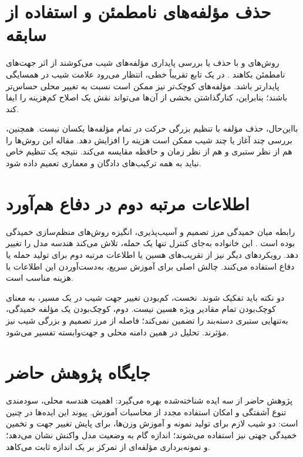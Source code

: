\section{حذف مؤلفه‌های نامطمئن و استفاده از سابقه}
روش‌های  و  با حذف یا بررسی پایداری مؤلفه‌های شیب می‌کوشند از اثر جهت‌های نامطمئن بکاهند \cite{golgooni2023zerograd}. در یک تابع تقریباً خطی، انتظار می‌رود علامت شیب در همسایگی پایدارتر باشد. مؤلفه‌های کوچک‌تر نیز ممکن است نسبت به تغییر محلی حساس‌تر باشند؛ بنابراین، کنارگذاشتن بخشی از آن‌ها می‌تواند نقش یک اصلاح کم‌هزینه را ایفا کند.

بااین‌حال، حذف مؤلفه با تنظیم بزرگی حرکت در تمام مؤلفه‌ها یکسان نیست. همچنین، بررسی چند آغاز یا چند شیب ممکن است هزینه را افزایش دهد. مقاله \sora{} این روش‌ها را هم از نظر ستبری و هم از نظر زمان و حافظه مقایسه می‌کند. نتیجه یک تنظیم خاص نباید به همه ترکیب‌های دادگان و معماری تعمیم داده شود.

\section{اطلاعات مرتبه دوم در دفاع هم‌آورد}
رابطه میان خمیدگی مرز تصمیم و آسیب‌پذیری، انگیزه روش‌های منظم‌سازی خمیدگی بوده است \cite{moosavi2019robustness}. این خانواده به‌جای کنترل تنها یک حمله، تلاش می‌کند هندسه مدل را تغییر دهد. رویکردهای دیگر نیز از تقریب‌های هسین یا اطلاعات مرتبه دوم برای تولید حمله یا دفاع استفاده می‌کنند. چالش اصلی برای آموزش سریع، به‌دست‌آوردن این اطلاعات با هزینه مناسب است.

دو نکته باید تفکیک شوند. نخست، کم‌بودن تغییر جهت شیب در یک مسیر، به معنای کوچک‌بودن تمام مقادیر ویژه هسین نیست. دوم، کوچک‌بودن یک مؤلفه خمیدگی، به‌تنهایی ستبری دسته‌بند را تضمین نمی‌کند؛ فاصله از مرز تصمیم و بزرگی شیب نیز مؤثرند. تحلیل \pertalign{} در همین دامنه محلی و جهت‌وابسته تفسیر می‌شود.

\section{جایگاه پژوهش حاضر}
پژوهش حاضر از سه ایده شناخته‌شده بهره می‌گیرد: اهمیت هندسه محلی، سودمندی تنوع آشفتگی و امکان استفاده مجدد از محاسبات آموزش. پیوند این ایده‌ها در \sora{} چنین است: دو شیب لازم برای تولید نمونه و آموزش وزن‌ها، برای پایش تغییر جهت و تخمین خمیدگی جهتی نیز استفاده می‌شوند؛ اندازه گام به وضعیت مدل واکنش نشان می‌دهد؛ و نمونه‌برداری مؤلفه‌ای از تمرکز بر یک اندازه ثابت می‌کاهد.


